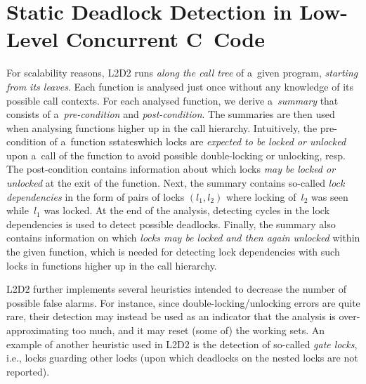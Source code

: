 \documentclass[runningheads]{llncs}
\begin{document}
\vspace*{-3.5mm}\section{Static Deadlock Detection in Low-Level Concurrent
C~Code}\vspace*{-2mm}

For scalability reasons, L2D2 runs \emph{along the call tree} of a~given
program, \emph{starting from its leaves}.
%
Each function is analysed just once without any knowledge of its possible call
contexts.
%
For each analysed function, we derive a~\emph{summary} that consists of
a~\emph{pre-condition} and \emph{post-condition}.
%
The summaries are then used when analysing functions higher up in the call
hierarchy.
%
%
%
Intuitively, the pre-condition of a~function sstateswhich locks are
\emph{expected to be locked or unlocked} upon a~call of the function to avoid
possible double-locking or unlocking, resp.
%
The post-condition contains information about which locks \emph{may be locked or
unlocked} at the exit of the function.
%
Next, the summary contains so-called \emph{lock dependencies} in the form of
pairs of locks $ (l_1, l_2) $ where locking of~$ l_2 $ was seen while~$ l_1 $
was locked.
%
At the end of the analysis, detecting cycles in the lock dependencies is used
to detect possible deadlocks.
%
Finally, the summary also contains information on which \emph{locks may be
locked and then again unlocked} within the given function, which is needed for
detecting lock dependencies with such locks in functions higher up in the call
hierarchy.

L2D2 further implements several heuristics intended to decrease the number
of possible false alarms.
%
For instance, since double-locking/unlocking errors are quite rare, their
detection may instead be used as an indicator that the analysis is
over-approximating too much, and it may reset (some of) the working sets.
%
An example of another heuristic used in L2D2 is the detection of so-called
\emph{gate locks}, i.e., locks guarding other locks (upon which deadlocks on the
nested locks are not reported).
\end{document}
